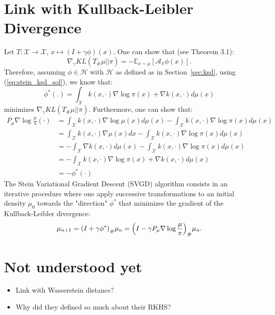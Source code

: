 \documentclass[runningheads,a4paper]{llncs}
\newcommand{\E}{\mathbb{E}}
\newcommand{\X}{\mathcal{X}}
\newcommand{\A}{\mathcal{A}}
\newcommand{\Hr}{\mathcal{H}}
\DeclarePairedDelimiter{\pare}{(}{)}
\begin{document}
\section{Link with Kullback-Leibler Divergence}
Let $T: \X \to \X$, $x \mapsto (I + \gamma \phi)(x)$. One can show that
(see \cite{https://doi.org/10.48550/arxiv.1608.04471} Theorem 3.1):
\begin{equation}
  \nabla_\gamma KL(T_\#\mu || \pi) = -\E_{x \sim \mu}[\A_\pi \phi(x)].
  \label{eq:grad_kl}
\end{equation}
Therefore, assuming $\phi \in \Hr$ with $\Hr$ as defined as in Section~\ref{sec:ksd},
using (\ref{eq:stein_ksd_sol}), we know that:
\begin{equation}
  \phi^*(.) = \int_\X k(x, \cdot) \nabla \log \pi(x) + \nabla k(x, \cdot) d\mu(x)
\end{equation}
minimizes $\nabla_\gamma KL(T_\#\mu || \pi)$.
Furthermore, one can show that:
\begin{equation}
  \begin{split}
    P_\mu \nabla \log \frac{\mu}{\pi} (\cdot) &=
      \int_\X k(x, \cdot) \nabla \log \mu(x) d\mu(x) - \int_\X k(x, \cdot) \nabla \log \pi (x) d\mu(x) \\
    &= \int_\X k(x, \cdot) \nabla \mu(x) dx - \int_\X k(x, \cdot) \nabla \log \pi (x) d\mu(x) \\
    &= - \int_\X \nabla k(x, \cdot) d\mu(x) - \int_\X k(x, \cdot) \nabla \log \pi (x) d\mu(x) \\
    &= - \int_\X k(x, \cdot) \nabla \log \pi (x) + \nabla k(x, \cdot) d\mu(x) \\
    &= -\phi^*(\cdot)
  \end{split}
\end{equation}
The Stein Variational Gradient Descent (SVGD) algorithm consists
in an iterative procedure where one apply successive transformations
to an initial density $\mu_0$ towards
the "direction" $\phi^*$ that minimizes the gradient of the Kullback-Leibler divergence:
\begin{equation}
  \mu_{n+1} = \pare*{ I + \gamma \phi^* }_\# \mu_n = \pare*{ I - \gamma P_\mu \nabla \log \frac{\mu}{\pi} }_\# \mu_n.
\end{equation}

\section{Not understood yet}
\begin{itemize}
  \item Link with Wasserstein distance?
  \item Why did they defined so much about their RKHS?
\end{itemize}
\end{document}
